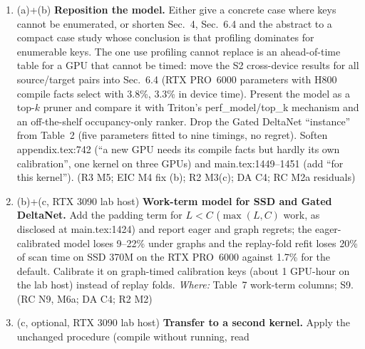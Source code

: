 \documentclass[11pt]{article}
\begin{document}
\begin{enumerate}[label=M4\alph*.]
        $\max(\mbox{latency},\mbox{throughput})$ form (Hong and Kim; Volkov)
        and report whether the selected chunks change. Model the last partial
        wave ($m=\min(r,\lceil n_p/n_{\mathrm{SM}}\rceil)$ assumes an even
        spread; $n_p/n_{\mathrm{SM}}$ is 1.4--2.7 at batch 1); validate the
        static spill-size proxy $\omega$ against measured local-memory traffic
        at the 255-register configurations ($C=512, 1024$; see M5e); and
        correct appendix.tex:793, which still calls $\sigma$ ``spill-store
        traffic''. \emph{Where:} Sec.~4, Eq.~(3) (406--518). (R2 M3(b), m5,
        m6; RC M3b)
  \item (a)+(b) \textbf{Reposition the model.} Either give a concrete case
        where keys cannot be enumerated, or shorten Sec.~4, Sec.~6.4 and the
        abstract to a compact case study whose conclusion is that profiling
        dominates for enumerable keys. The one use profiling cannot replace is
        an ahead-of-time table for a GPU that cannot be timed: move the S2
        cross-device results for all source/target pairs into Sec.~6.4 (RTX
        PRO~6000 parameters with H800 compile facts select with 3.8\%, 3.3\%
        in device time). Present the model as a top-$k$ pruner and compare it
        with Triton's perf\_model/top\_k mechanism and an off-the-shelf
        occupancy-only ranker. Drop the Gated DeltaNet ``instance'' from
        Table~2 (five parameters fitted to nine timings, no regret). Soften
        appendix.tex:742 (``a new GPU needs its compile facts but hardly its
        own calibration'', one kernel on three GPUs) and main.tex:1449--1451
        (add ``for this kernel''). (R3 M5; EIC M4 fix (b); R2 M3(c); DA C4; RC
        M2a residuals)
  \item (b)+(c, RTX 3090 lab host) \textbf{Work-term model for SSD and Gated
        DeltaNet.} Add the padding term for $L<C$ ($\max(L,C)$ work, as
        disclosed at main.tex:1424) and report eager and graph regrets; the
        eager-calibrated model loses 9--22\% under graphs and the replay-fold
        refit loses 20\% of scan time on SSD 370M on the RTX PRO~6000 against
        1.7\% for the default. Calibrate it on graph-timed calibration keys
        (about 1 GPU-hour on the lab host) instead of replay folds.
        \emph{Where:} Table~7 work-term columns; S9. (RC N9, M6a; DA C4; R2
        M2)
  \item (c, optional, RTX 3090 lab host) \textbf{Transfer to a second
        kernel.} Apply the unchanged procedure (compile without running, read

\end{enumerate}
\end{document}
